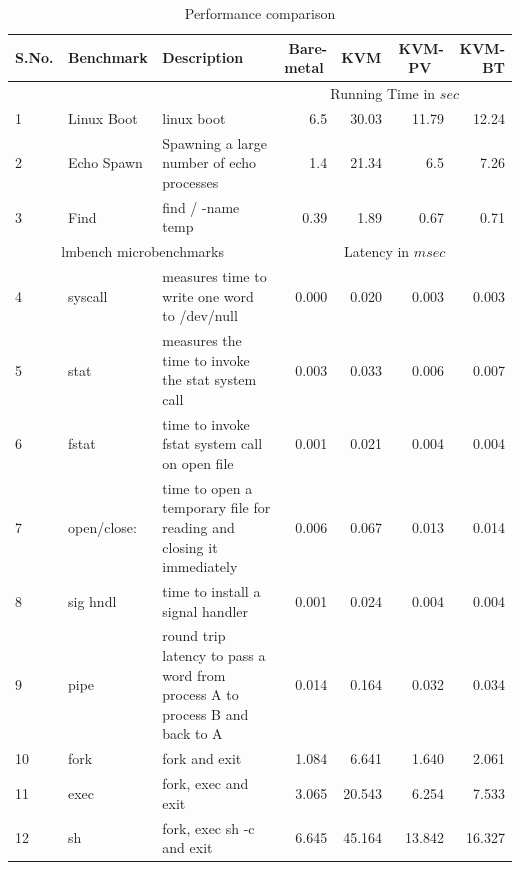 \documentclass[10pt,twocolumn]{article}
\begin{document}
\begin{table}
\centering
\caption{Performance comparison}
      \begin{tabular}{|l| l|p{5cm} | r r r r|} \hline
	        S.No.\verb, ,&  Benchmark\verb, ,& Description  & Bare-metal \verb, ,& KVM \verb, , & KVM-PV \verb, ,& KVM-BT \\ \hline

     &&& \multicolumn{4}{c|}{ Running Time in $sec$}\\\cline {4-7}  
      1&  Linux Boot& linux boot & 6.5	&	30.03	&	11.79	&	12.24 \\ \hline
      2& Echo Spawn	& Spawning a large number of echo processes&1.4	&	21.34	&	6.5	&	7.26\\\hline
      3& Find	& find / -name temp & 0.39	&	1.89	&	0.67	&	0.71 \\ \hline
	   \multicolumn{3}{|c}{ lmbench microbenchmarks }& \multicolumn{4}{c|}{Latency in $msec$}\\  \hline

4	&	syscall	&	 measures time to write one word to /dev/null	&	0.000	&	0.020	&	0.003	&	0.003	\\	\hline
5	&	stat	&	 measures the time to invoke the stat system call	&	0.003	&	0.033	&	0.006	&	0.007	\\	\hline
6	&	fstat	&	time to invoke fstat system call on open file 	&	0.001	&	0.021	&	0.004	&	0.004	\\	\hline
7	&	open/close:	&	 time to open a temporary file for reading and closing it immediately 	&	0.006	&	0.067	&	0.013	&	0.014	\\	\hline
8	&	sig hndl	&	 time to install a signal handler	&	0.001	&	0.024	&	0.004	&	0.004	\\	\hline
9	&	pipe 	&	 round trip latency to pass a word from process A to process B and back to A	&	0.014	&	0.164	&	0.032	&	0.034	\\	\hline
10	&	fork	&	 fork and exit 	&	1.084	&	6.641	&	1.640	&	2.061	\\	\hline
11	&	exec	&	 fork, exec and exit	&	3.065	&	20.543	&	6.254	&	7.533	\\	\hline
12	&	sh	&	 fork, exec sh -c and exit	&	6.645	&	45.164	&	13.842	&	16.327	\\	\hline



        \hline
      \end{tabular}
\label{tab:kvm_performance}
\end{table} 
\end{document}
